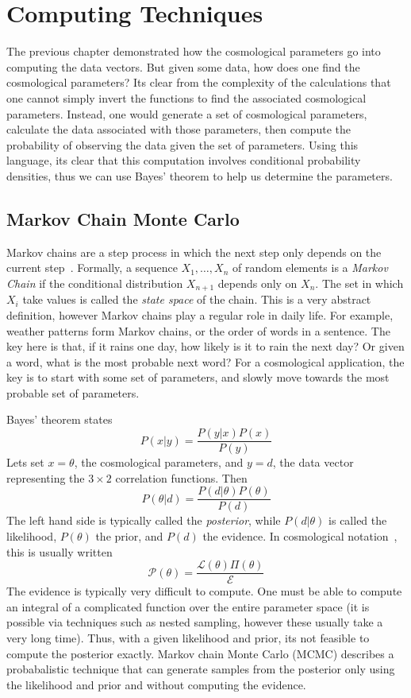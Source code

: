 \chapter{Computing Techniques}
The previous chapter demonstrated how the cosmological parameters go into computing the data vectors. But given some data, how does one find the cosmological parameters? Its clear from the complexity of the calculations that one cannot simply invert the functions to find the associated cosmological parameters. Instead, one would generate a set of cosmological parameters, calculate the data associated with those parameters, then compute the probability of observing the data given the set of parameters. Using this language, its clear that this computation involves conditional probability densities, thus we can use Bayes' theorem to help us determine the parameters.

\section{Markov Chain Monte Carlo}
Markov chains are a step process in which the next step only depends on the current step~\cite{agrahari_monte_2021}. Formally, a
sequence $X_1,\hdots,X_n$ of random elements is a \textit{Markov Chain} if the conditional distribution $X_{n+1}$ depends only on $X_n$. The set in which $X_i$ take values is called the \textit{state space} of the chain. This is a very abstract definition, however Markov chains play a regular role in daily life. For example, weather patterns form Markov chains, or the order of words in a sentence. The key here is that, if it rains one day, how likely is it to rain the next day? Or given a word, what is the most probable next word? For a cosmological application, the key is to start with some set of parameters, and slowly move towards the most probable set of parameters.

Bayes' theorem states
\begin{equation}
	P(x|y) = \frac{P(y|x) P(x)}{P(y)}
\end{equation}
Lets set $x=\theta$, the cosmological parameters, and $y=d$, the data vector representing the $3\times 2$ correlation functions. Then
\begin{equation}
	P(\theta|d) = \frac{P(d|\theta) P(\theta)}{P(d)}
\end{equation}
The left hand side is typically called the \textit{posterior}, while $P(d|\theta)$ is called the likelihood, $P(\theta)$ the prior, and $P(d)$ the evidence. In cosmological notation~\cite{raveri_non-gaussian_2021}, this is usually written
\begin{equation}
	\mathcal{P}(\theta) = \frac{\mathcal{L}(\theta) \Pi(\theta)}{\mathcal{E}}
\end{equation}
The evidence is typically very difficult to compute. One must be able to compute an integral of a complicated function over the entire parameter space (it is possible via techniques such as nested sampling, however these usually take a very long time). Thus, with a given likelihood and prior, its not feasible to compute the posterior exactly. Markov chain Monte Carlo (MCMC) describes a probabalistic technique that can generate samples from the posterior only using the likelihood and prior and without computing the evidence.
